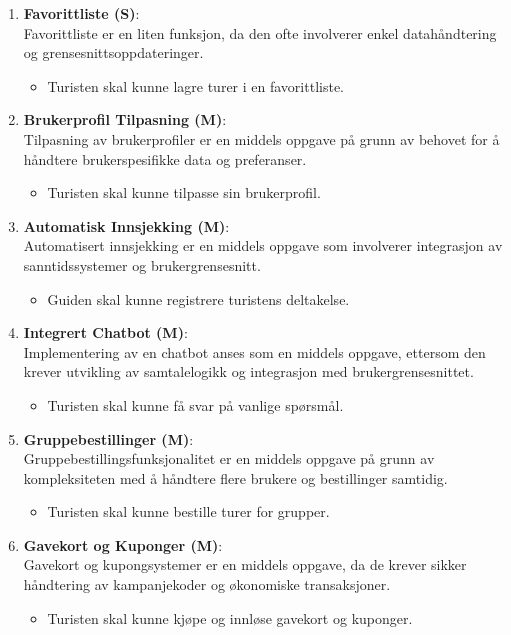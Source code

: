 \documentclass[../doc.tex]{subfiles}
\begin{document}
\begin{enumerate}
    \item \textbf{Favorittliste (S)}: \\
    Favorittliste er en liten funksjon, da den ofte involverer enkel datahåndtering og grensesnittsoppdateringer.
    \begin{itemize}
        \item Turisten skal kunne lagre turer i en favorittliste.
    \end{itemize}

    \item \textbf{Brukerprofil Tilpasning (M)}: \\
    Tilpasning av brukerprofiler er en middels oppgave på grunn av behovet for å håndtere brukerspesifikke data og preferanser.
    \begin{itemize}
        \item Turisten skal kunne tilpasse sin brukerprofil.
    \end{itemize}

    \item \textbf{Automatisk Innsjekking (M)}: \\
    Automatisert innsjekking er en middels oppgave som involverer integrasjon av sanntidssystemer og brukergrensesnitt.
    \begin{itemize}
        \item Guiden skal kunne registrere turistens deltakelse.
    \end{itemize}

    \item \textbf{Integrert Chatbot (M)}: \\
    Implementering av en chatbot anses som en middels oppgave, ettersom den krever utvikling av samtalelogikk og integrasjon med brukergrensesnittet.
    \begin{itemize}
        \item Turisten skal kunne få svar på vanlige spørsmål.
    \end{itemize}

    \item \textbf{Gruppebestillinger (M)}: \\
    Gruppebestillingsfunksjonalitet er en middels oppgave på grunn av kompleksiteten med å håndtere flere brukere og bestillinger samtidig.
    \begin{itemize}
        \item Turisten skal kunne bestille turer for grupper.
    \end{itemize}

    \item \textbf{Gavekort og Kuponger (M)}: \\
    Gavekort og kupongsystemer er en middels oppgave, da de krever sikker håndtering av kampanjekoder og økonomiske transaksjoner.
    \begin{itemize}
        \item Turisten skal kunne kjøpe og innløse gavekort og kuponger.
    \end{itemize}


\end{enumerate}
\end{document}
